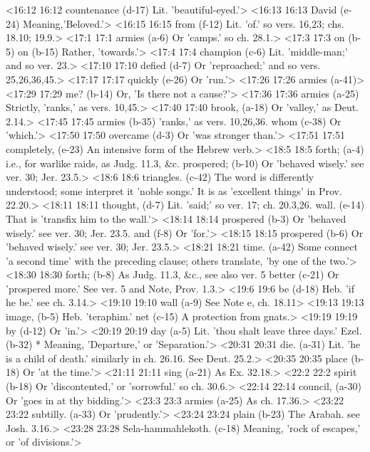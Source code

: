 <16:12 16:12  countenance (d-17)  Lit. 'beautiful-eyed.'>
<16:13 16:13  David (e-24)  Meaning,'Beloved.'>
<16:15 16:15  from (f-12)  Lit. 'of.' so vers. 16,23; chs. 18.10; 19.9.>
<17:1 17:1  armies (a-6)  Or 'camps.' so ch. 28.1.>
<17:3 17:3  on (b-5)  on (b-15)
  Rather, 'towards.'>
<17:4 17:4  champion (c-6)  Lit. 'middle-man;' and so ver. 23.>
<17:10 17:10  defied (d-7)  Or 'reproached;' and so vers. 25,26,36,45.>
<17:17 17:17  quickly (e-26)  Or 'run.'>
<17:26 17:26  armies (a-41)>
<17:29 17:29  me? (b-14)  Or, 'Is there not a cause?'>
<17:36 17:36  armies (a-25)  Strictly, 'ranks,' as vers. 10,45.>
<17:40 17:40  brook, (a-18)  Or 'valley,' as Deut. 2.14.>
<17:45 17:45  armies (b-35)  'ranks,' as vers. 10,26,36.
  whom (c-38)  Or 'which.'>
<17:50 17:50  overcame (d-3)  Or 'was stronger than.'>
<17:51 17:51  completely, (e-23)  An intensive form of the Hebrew verb.>
<18:5 18:5  forth; (a-4)  i.e., for warlike raids, as Judg. 11.3, &c.
  prospered; (b-10) Or 'behaved wisely.' see ver. 30; Jer. 23.5.>
<18:6 18:6  triangles. (c-42)  The word is differently understood; some interpret it 'noble  songs.' It is as 'excellent things' in Prov. 22.20.>
<18:11 18:11  thought, (d-7)  Lit. 'said;' so ver. 17; ch. 20.3,26.
  wall. (e-14)  That is 'transfix him to the wall.'>
<18:14 18:14  prospered (b-3) Or 'behaved wisely.' see ver. 30; Jer. 23.5.
  and (f-8)  Or 'for.'>
<18:15 18:15  prospered (b-6)  Or 'behaved wisely.' see ver. 30; Jer. 23.5.>
<18:21 18:21  time. (a-42)  Some connect 'a second time' with the preceding clause;  others translate, 'by one of the two.'>
<18:30 18:30  forth; (b-8)  As Judg. 11.3, &c., see also ver. 5
  better (c-21)  Or 'prospered more.' See ver. 5 and Note, Prov. 1.3.>
<19:6 19:6  be (d-18)  Heb. 'if he be.' see ch. 3.14.>
<19:10 19:10  wall (a-9)  See Note e, ch. 18.11>
<19:13 19:13  image, (b-5)  Heb. 'teraphim.'
  net (c-15)  A protection from gnats.>
<19:19 19:19  by (d-12)  Or 'in.'>
<20:19 20:19  day (a-5)  Lit. 'thou shalt leave three days.'
  Ezel. (b-32)  * Meaning, 'Departure,' or 'Separation.'>
<20:31 20:31  die. (a-31)  Lit. 'he is a child of death.' similarly in ch. 26.16. See  Deut. 25.2.>
<20:35 20:35  place (b-18)  Or 'at the time.'>
<21:11 21:11  sing (a-21)  As Ex. 32.18.>
<22:2 22:2  spirit (b-18)  Or 'discontented,' or 'sorrowful.' so ch. 30.6.>
<22:14 22:14  council, (a-30)  Or 'goes in at thy bidding.'>
<23:3 23:3  armies (a-25)  As ch. 17.36.>
<23:22 23:22  subtilly. (a-33)  Or 'prudently.'>
<23:24 23:24  plain (b-23)  The Arabah. see Josh. 3.16.>
<23:28 23:28  Sela-hammahlekoth. (c-18)  Meaning, 'rock of escapes,' or 'of divisions.'>
